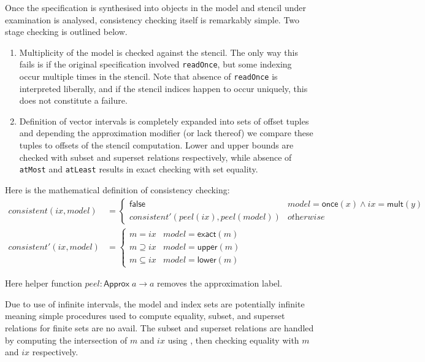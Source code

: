 \documentclass[acmlarge,review]{acmart}
\theoremstyle{definition}
\theoremstyle{plain}
\theoremstyle{remark}
\begin{document}
Once the specification is synthesised into objects in the model and stencil
under examination is analysed, consistency checking itself is remarkably simple.
Two stage checking is outlined below.

\begin{enumerate}
  \item Multiplicity of the model is checked against the stencil. The only way
    this fails is if the original specification involved \texttt{readOnce}, but
    some indexing occur multiple times in the stencil.  Note that absence of
    \texttt{readOnce} is interpreted liberally, and if the stencil indices
    happen to occur uniquely, this does not constitute a failure.
  \item Definition of vector intervals is completely expanded into sets of
    offset tuples and depending the approximation modifier (or lack thereof)
    we compare these tuples to offsets of the stencil computation. Lower and
    upper bounds are checked with subset and superset relations respectively,
    while absence of \texttt{atMost} and \texttt{atLeast} results in exact
    checking with set equality.
\end{enumerate}

Here is the mathematical definition of consistency checking:
\begin{align*}
  \mathit{consistent}(\mathit{ix}, \mathit{model}) & = \begin{cases}
    \mathsf{false} & \mathit{model} = \mathsf{once}(x) \wedge ix = \mathsf{mult}(y) \\
    \mathit{consistent'}(\mathit{peel}(ix), \mathit{peel}(model)) & \textit{otherwise}
  \end{cases} \\
%
  \mathit{consistent'}(\mathit{ix}, \mathit{model}) & = \begin{cases}
    m = \mathit{ix} & \mathit{model} = \mathsf{exact}(m) \\
    m \supseteq \mathit{ix} & \mathit{model} = \mathsf{upper}(m) \\
    m \subseteq \mathit{ix} & \mathit{model} = \mathsf{lower}(m)
  \end{cases}
\end{align*}

Here helper function $\mathit{peel} : \mathsf{Approx} \; a \to a$ removes the
approximation label.

Due to use of infinite intervals, the model and index sets are potentially
infinite meaning simple procedures used to compute equality, subset, and
superset relations for finite sets are no avail. The subset and superset
relations are handled by computing the intersection of $m$ and $\mathit{ix}$
using , then checking equality with $m$ and
$\mathit{ix}$ respectively.
\end{document}
